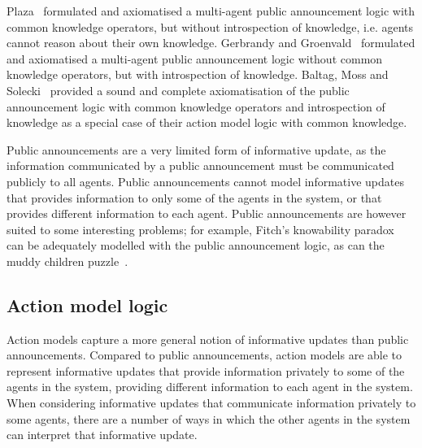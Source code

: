Plaza~\cite{plaza:1989} formulated and axiomatised a multi-agent public
announcement logic with common knowledge operators, but without introspection of
knowledge, i.e. agents cannot reason about their own knowledge.  Gerbrandy and
Groenvald~\cite{gerbrandy:1997} formulated and axiomatised a multi-agent public
announcement logic without common knowledge operators, but with introspection of
knowledge. Baltag, Moss and Solecki~\cite{baltag:1998,baltag:2004} provided a sound
and complete axiomatisation of the public announcement logic with common
knowledge operators and introspection of knowledge as a special case of their
action model logic with common knowledge.

Public announcements are a very limited form of informative update, as the
information communicated by a public announcement must be communicated publicly
to all agents. Public announcements cannot model informative updates that
provides information to only some of the agents in the system, or that provides
different information to each agent. Public announcements are however suited to
some interesting problems; for example, Fitch's knowability
paradox~\cite{fitch:1963} can be adequately modelled with the public announcement
logic, as can the muddy children puzzle~\cite{barwise:1981, vanditmarsch:2007}.


\subsection{Action model logic}

Action models capture a more general notion of informative updates than public
announcements. Compared to public announcements, action models are able to
represent informative updates that provide information privately to some of the
agents in the system, providing different information to each agent in the
system. When considering informative updates that communicate information privately to
some agents, there are a number of ways in which the other agents in the system
can interpret that informative update. 

